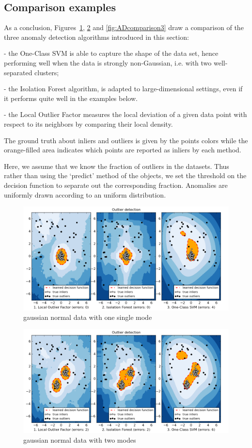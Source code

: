 \subsection{Comparison examples}

As a conclusion,
Figures~\ref{fig:ADcomparison1}, \ref{fig:ADcomparison2} and \ref{fig:ADcomparison3} draw a comparison of the three anomaly detection algorithms introduced in this section:

- the One-Class SVM is able to capture the shape of the
  data set, hence performing well when the data is strongly
  non-Gaussian, i.e. with two well-separated clusters;

- the Isolation Forest algorithm, is adapted to
  large-dimensional settings, even if it performs quite well in the
  examples below.

- the Local Outlier Factor measures the local deviation of a given
  data point with respect to its neighbors by comparing their local density.

The ground truth about inliers and outliers is given by the points colors
while the orange-filled area indicates which points are reported as inliers
by each method.

Here, we assume that we know the fraction of outliers in the datasets.
Thus rather than using the `predict' method of the objects, we set the
threshold on the decision function to separate out the corresponding
fraction. Anomalies are uniformly drawn according to an uniform distribution.


\begin{figure}[H]
  \centering
  \includegraphics[width=.9\linewidth]{fig_source/ADcomparison1}
  \caption{gaussian normal data with one single mode}
  \label{fig:ADcomparison1}
\end{figure}

\begin{figure}[H]
  \centering
  \includegraphics[width=.9\linewidth]{fig_source/ADcomparison2}
  \caption{gaussian normal data with two modes}
  \label{fig:ADcomparison2}
\end{figure}


